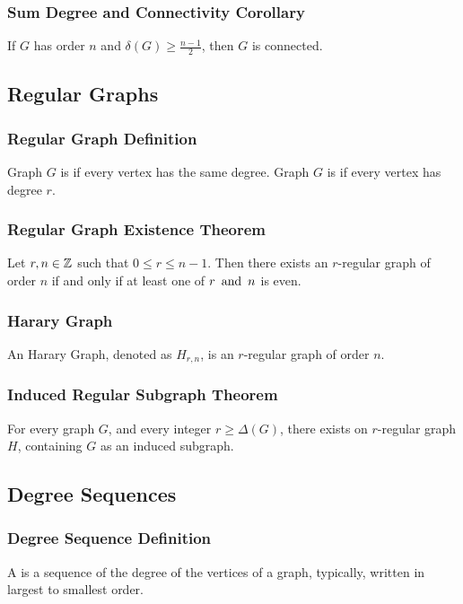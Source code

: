 \subsubsection*{Sum Degree and Connectivity Corollary}
If $G$ has order $n$ and $\delta(G) \geq \frac{n-1}{2}$, then $G$ is connected.

\subsection{Regular Graphs}

\subsubsection*{Regular Graph Definition}
Graph $G$ is  if every vertex has the same degree. Graph $G$ is  if every vertex has degree $r$.

\subsubsection*{Regular Graph Existence Theorem}
Let $r,n \in \mathbb{Z}$ such that $0 \leq r \leq n-1$. Then there exists an $r$-regular graph of order $n$ if and only if at least one of $r \operatorname{~\text{and}~} n$ is even.

\subsubsection*{Harary Graph}
An Harary Graph, denoted as $H_{r,n}$, is an $r$-regular graph of order $n$.

\subsubsection*{Induced Regular Subgraph Theorem}
For every graph $G$, and every integer $r \geq \Delta(G)$, there exists on $r$-regular graph $H$, containing $G$ as an induced subgraph.

\subsection{Degree Sequences}

\subsubsection*{Degree Sequence Definition}
A  is a sequence of the degree of the vertices of a graph, typically, written in largest to smallest order.

